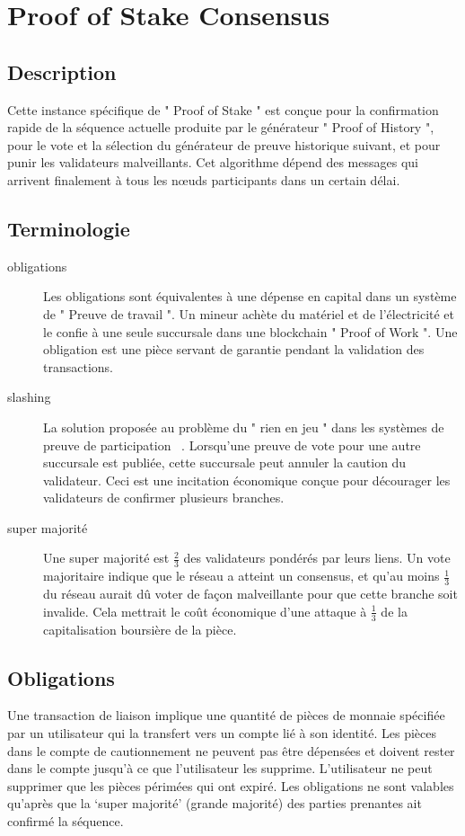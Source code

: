 \documentclass[12pt]{article}
\begin{document}
\section{Proof of Stake Consensus}\label{proof_of_stake}
\subsection{Description}
Cette instance spécifique de " Proof of Stake " est conçue pour la confirmation rapide de la séquence actuelle produite par le générateur " Proof of History ", pour le vote et la sélection du générateur de preuve historique suivant, et pour punir les validateurs malveillants. Cet algorithme dépend des messages qui arrivent finalement à tous les nœuds participants dans un certain délai.
\subsection{Terminologie}
\begin{description}

\item[obligations]
Les obligations sont équivalentes à une dépense en capital dans un système de " Preuve de travail ". Un mineur achète du matériel et de l'électricité et le confie à une seule succursale dans une blockchain " Proof of Work ". Une obligation est une pièce servant de garantie pendant la validation des transactions.

\item[slashing]

La solution proposée au problème du " rien en jeu " dans les systèmes de preuve de participation ~\cite{slasher}. Lorsqu'une preuve de vote pour une autre succursale est publiée, cette succursale peut annuler la caution du validateur. Ceci est une incitation économique conçue pour décourager les validateurs de confirmer plusieurs branches.
\item[super majorité]
Une super majorité est \(\frac{2}{3}\) des validateurs pondérés par leurs liens. Un vote majoritaire indique que le réseau a atteint un consensus, et qu'au moins \(\frac{1}{3}\) du réseau aurait dû voter de façon malveillante pour que cette branche soit invalide. Cela mettrait le coût économique d'une attaque à \(\frac{1}{3}\) de la capitalisation boursière de la pièce.

\end{description}

\subsection{Obligations}
Une transaction de liaison implique une quantité de pièces de monnaie spécifiée par un utilisateur qui la transfert vers un compte lié à son identité. Les pièces dans le compte de cautionnement ne peuvent pas être dépensées et doivent rester dans le compte jusqu'à ce que l'utilisateur les supprime. L'utilisateur ne peut supprimer que les pièces périmées qui ont expiré. Les obligations ne sont valables qu’après que la ‘super majorité’ (grande majorité) des parties prenantes ait confirmé la séquence.
\end{document}
